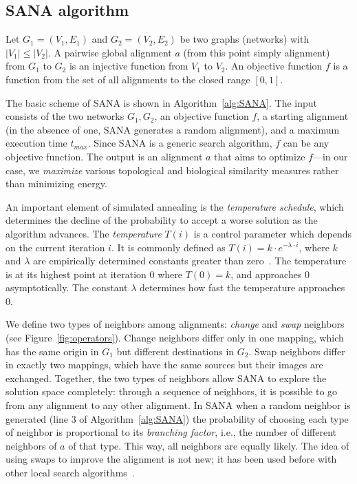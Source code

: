 \documentclass{bioinfo}
\begin{document}
\begin{methods}
\subsection{SANA algorithm}
Let $G_1=(V_1,E_1)$ and $G_2=(V_2,E_2)$ be two graphs (networks) with $|V_1|\leq|V_2|$. A pairwise global alignment $a$ (from this point simply alignment) from $G_1$ to $G_2$ is an injective function from $V_1$ to $V_2$. An objective function $f$ is a function from the set of all alignments to the closed range $[0,1]$.

The basic scheme of SANA is shown in Algorithm~\ref{alg:SANA}. The input consists of the two networks $G_1,G_2$, an objective function $f$, a starting alignment (in the absence of one, SANA generates a random alignment), and a maximum execution time $t_{max}$. Since SANA is a generic search algorithm, $f$ can be any objective function. The output is an alignment $a$ that aims to optimize $f$---in our case, we {\it maximize} various topological and biological similarity measures rather than minimizing energy.

An important element of simulated annealing is the \textit{temperature schedule}, which determines the decline of the probability to accept a worse solution as the algorithm advances. The \textit{temperature} $T(i)$ is a control parameter which depends on the current iteration $i$. It is commonly defined as $T(i)=k\cdot e^{-\lambda\cdot i}$, where $k$ and $\lambda$ are empirically determined constants greater than zero~\citep{SA1}. The temperature is at its highest point at iteration 0 where $T(0)=k$, and approaches 0 asymptotically. The constant $\lambda$ determines how fast the temperature approaches 0.

We define two types of neighbors among alignments: \textit{change} and \textit{swap} neighbors (see Figure~\ref{fig:operators}). Change neighbors differ only in one mapping, which has the same origin in $G_1$ but different destinations in $G_2$. Swap neighbors differ in exactly two mappings, which have the same sources but their images are exchanged. Together, the two types of neighbors allow SANA to explore the solution space completely: through a sequence of neighbors, it is possible to go from any alignment to any other alignment. In SANA when a random neighbor is generated (line 3 of Algorithm~\ref{alg:SANA}) the probability of choosing each type of neighbor is proportional to its \textit{branching factor}, i.e., the number of different neighbors of $a$ of that type. This way, all neighbors are equally likely. The idea of using swaps to improve the alignment is not new; it has been used before with other local search algorithms~\citep{PISwap,MAGNA}.



\end{methods}
\end{document}
